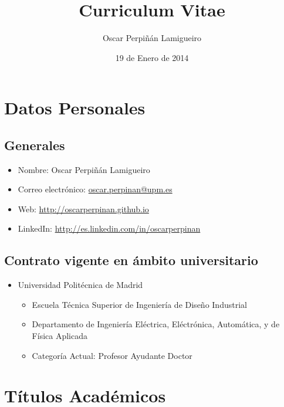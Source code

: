 \documentclass[article, a4paper]{memoir}
\author{Oscar Perpiñán Lamigueiro}
\date{19 de Enero de 2014}
\title{Curriculum Vitae}
\begin{document}
\maketitle


\section{Datos Personales}
\label{sec-1}

\subsection{Generales}
\label{sec-1-1}

\begin{itemize}
\item Nombre: Oscar Perpiñán Lamigueiro
\item Correo electrónico: \href{mailto:oscar.perpinan@upm.es}{oscar.perpinan@upm.es}
\item Web: \url{http://oscarperpinan.github.io}
\item LinkedIn: \url{http://es.linkedin.com/in/oscarperpinan}
\end{itemize}

\subsection{Contrato vigente en ámbito universitario}
\label{sec-1-2}

\begin{itemize}
\item Universidad Politécnica de Madrid
\begin{itemize}
\item Escuela Técnica Superior de Ingeniería de Diseño Industrial
\item Departamento de Ingeniería Eléctrica, Eléctrónica, Automática, y de Física Aplicada
\item Categoría Actual: Profesor Ayudante Doctor
\end{itemize}
\end{itemize}


\section{Títulos Académicos}
\label{sec-2}
\end{document}
